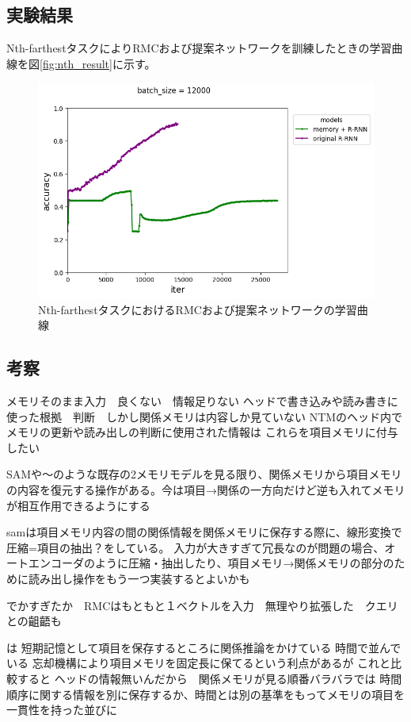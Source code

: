 \subsection{実験結果}
Nth-farthestタスクによりRMCおよび提案ネットワークを訓練したときの学習曲線を図\ref{fig:nth_result}に示す。
\begin{figure}[t]
	\centering
	\includegraphics[width=\linewidth]{./figure/nth/orig_rrnn_id1.png}
	\caption{Nth-farthestタスクにおけるRMCおよび提案ネットワークの学習曲線}
	\label{fig:nth\result}
\end{figure}

\subsection{考察}
メモリそのまま入力　良くない　情報足りない
ヘッドで書き込みや読み書きに使った根拠　判断　しかし関係メモリは内容しか見ていない
NTMのヘッド内でメモリの更新や読み出しの判断に使用された情報は
これらを項目メモリに付与したい

SAMや\cite{working2mem}〜のような既存の2メモリモデルを見る限り、関係メモリから項目メモリの内容を復元する操作がある。今は項目→関係の一方向だけど逆も入れてメモリが相互作用できるようにする

samは項目メモリ内容の間の関係情報を関係メモリに保存する際に、線形変換で圧縮=項目の抽出？をしている。
入力が大きすぎて冗長なのが問題の場合、オートエンコーダのように圧縮・抽出したり、項目メモリ→関係メモリの部分のために読み出し操作をもう一つ実装するとよいかも

でかすぎたか　RMCはもともと１ベクトルを入力　無理やり拡張した　クエリとの齟齬も

\cite{working2mem}は
短期記憶として項目を保存するところに関係推論をかけている
時間で並んでいる
忘却機構により項目メモリを固定長に保てるという利点があるが
これと比較すると
ヘッドの情報無いんだから　関係メモリが見る順番バラバラでは
時間順序に関する情報を別に保存するか、時間とは別の基準をもってメモリの項目を一貫性を持った並びに

